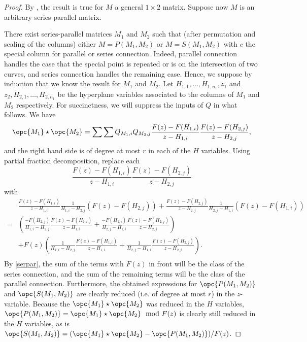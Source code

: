 \documentclass[12pt]{amsart}
\theoremstyle{plain}
\theoremstyle{definition}
\theoremstyle{remark}
\begin{document}
\begin{proof}
By , the result is true for $M$ a general $1 \times 2$ matrix. Suppose now $M$ is an arbitrary series-parallel matrix.

There exist series-parallel matrices $M_1$ and $M_2$ such that (after permutation and scaling of the columns) either $M=P(M_1,M_2)$ or $M=S(M_1,M_2)$ with $c$ the special column for parallel or series connection. Indeed, parallel connection handles the case that the special point is repeated or is on the intersection of two curves, and series connection handles the remaining case. Hence, we suppose by induction that we know the result for $M_1$ and $M_2$. Let $H_{1,1},\ldots,H_{1,n_1}, z_1$ and $z_2, H_{2,1},\ldots,H_{2,n_1}$ be the hyperplane variables associated to the columns of $M_1$ and $M_2$ respectively. For succinctness, we will suppress the inputs of $Q$ in what follows. We have
\begin{align*}
\opc{M_1}\star \opc{M_2}=\sum \sum Q_{M_1,i}Q_{M_2,j}\frac{F(z)-F(H_{1,i})}{z-H_{1,i}}\frac{F(z)-F(H_{2,j})}{z-H_{2,j}},
\end{align*}
and the right hand side is of degree at most $r$ in each of the $H$ variables.
Using partial fraction decomposition, replace each $$\frac{F(z)-F(H_{1,i})}{z-H_{1,i}}\frac{F(z)-F(H_{2,j})}{z-H_{2,j}}$$ with
\begin{align*}
&\frac{F(z)-F(H_{1,i})}{z-H_{1,i}}\frac{1}{H_{1,i}-H_{2,j}}(F(z)-F(H_{2,j}))+\frac{F(z)-F(H_{2,j})}{z-H_{2,j}}\frac{1}{H_{2,j}-H_{1,i}}(F(z)-F(H_{1,i}))\\
=&\left(\frac{-F(H_{2,j})}{H_{1,i}-H_{2,j}}\frac{F(z)-F(H_{1,i})}{z-H_{1,i}}+\frac{-F(H_{1,i})}{H_{2,j}-H_{1,i}}\frac{F(z)-F(H_{2,j})}{z-H_{2,j}}\right)\\
&+F(z)\left(\frac{1}{H_{1,i}-H_{2,j}}\frac{F(z)-F(H_{1,i})}{z-H_{1,i}}+\frac{1}{H_{2,j}-H_{1,i}}\frac{F(z)-F(H_{2,j})}{z-H_{2,j}}\right).\\
\end{align*}
By \cref{serpar}, the sum of the terms with $F(z)$ in front will be the class of the series connection, and the sum of the remaining terms will be the class of the parallel connection. Furthermore, the obtained expressions for $\opc{P(M_1,M_2)}$ and $\opc{S(M_1,M_2)}$ are clearly reduced (i.e. of degree at most $r$) in the $z$-variable. Because the $\opc{M_1}\star \opc{M_2}$ was reduced in the $H$ variables, $\opc{P(M_1,M_2)}=\opc{M_1}\star \opc{M_2} \mod F(z)$ is clearly still reduced in the $H$ variables, as is $\opc{S(M_1,M_2)}=(\opc{M_1}\star \opc{M_2}-\opc{P(M_1,M_2)})/F(z)$.
\end{proof}
\end{document}
